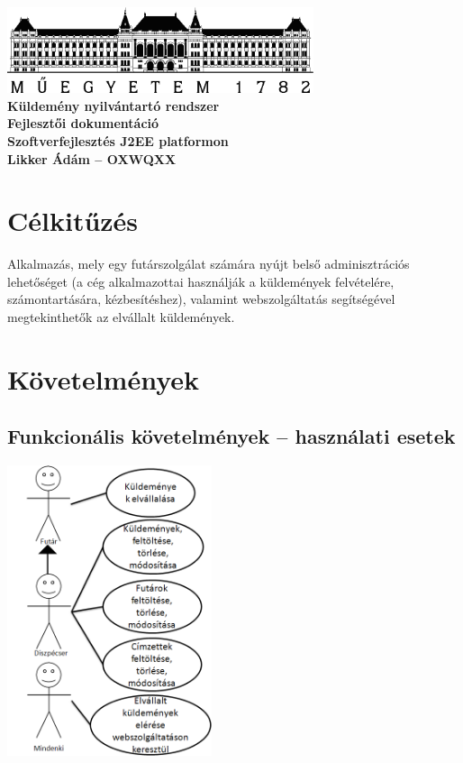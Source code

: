 \documentclass[a4paper,oneside,12pt]{article}
\begin{document}
\begin{titlepage}
	\pagestyle{empty}
	\begin{center}
		{\vfill \bf {\LARGE  \includegraphics[width=90mm,keepaspectratio]{BMElogo.png} \\[90pt] Küldemény nyilvántartó rendszer \\Fejlesztői dokumentáció\\[60pt]} \Large Szoftverfejlesztés J2EE platformon\\[90pt] Likker Ádám -- OXWQXX}
	\end{center}
\end{titlepage}
\section{Célkitűzés}
Alkalmazás, mely egy futárszolgálat számára nyújt belső adminisztrációs lehetőséget
(a cég alkalmazottai használják a küldemények felvételére, számontartására, kézbesítéshez),
valamint webszolgáltatás segítségével megtekinthetők az elvállalt küldemények.
\section{Követelmények}
\subsection{Funkcionális követelmények -- használati esetek}
\begin{center}
        \includegraphics[width=6cm]{usecase.PNG}
        \label{fig:ntier}
\end{center}
\end{document}
